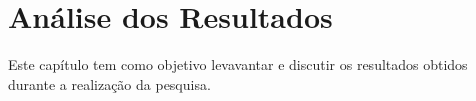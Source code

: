 \chapter[Análise dos Resultados]{Análise dos Resultados}

Este capítulo tem como objetivo levavantar e discutir os resultados obtidos durante a realização da pesquisa.
